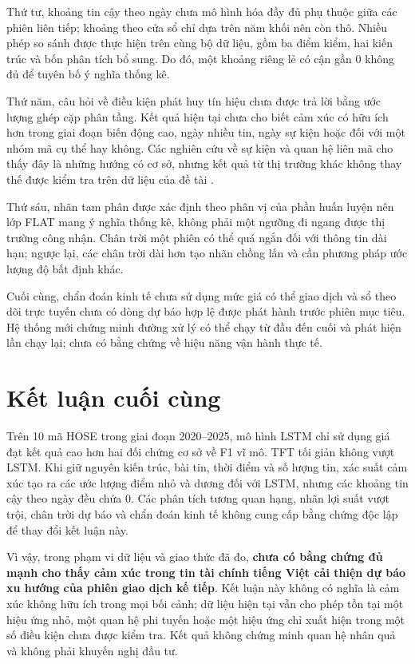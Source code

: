 \documentclass[12pt, a4paper, oneside]{report}
\begin{document}
Thứ tư, khoảng tin cậy theo ngày chưa mô hình hóa đầy đủ phụ thuộc giữa các phiên liên
tiếp; khoảng theo cửa sổ chỉ dựa trên năm khối nên còn thô. Nhiều phép so sánh được
thực hiện trên cùng bộ dữ liệu, gồm ba điểm kiểm, hai kiến trúc và bốn phân tích bổ sung.
Do đó, một khoảng riêng lẻ có cận gần 0 không đủ để tuyên bố ý nghĩa thống kê.


Thứ năm, câu hỏi về điều kiện phát huy tín hiệu chưa được trả lời bằng ước lượng ghép
cặp phân tầng. Kết quả hiện tại chưa cho biết cảm xúc có hữu ích hơn trong giai đoạn
biến động cao, ngày nhiều tin, ngày sự kiện hoặc đối với một nhóm mã cụ thể hay không.
Các nghiên cứu về sự kiện và quan hệ liên mã cho thấy đây là những hướng có cơ sở, nhưng
kết quả từ thị trường khác không thay thế được kiểm tra trên dữ liệu của đề tài
\cite{Chen2019_191005078v1,Xu2021_210207372v2}.

Thứ sáu, nhãn tam phân được xác định theo phân vị của phần huấn luyện nên lớp FLAT mang
ý nghĩa thống kê, không phải một ngưỡng đi ngang được thị trường công nhận. Chân trời
một phiên có thể quá ngắn đối với thông tin dài hạn; ngược lại, các chân trời dài hơn
tạo nhãn chồng lấn và cần phương pháp ước lượng độ bất định khác.

Cuối cùng, chẩn đoán kinh tế chưa sử dụng mức giá có thể giao dịch và sổ theo dõi trực
tuyến chưa có dòng dự báo hợp lệ được phát hành trước phiên mục tiêu. Hệ thống mới chứng
minh đường xử lý có thể chạy từ đầu đến cuối và phát hiện lần chạy lại; chưa có bằng
chứng về hiệu năng vận hành thực tế.

\section{Kết luận cuối cùng}

Trên 10 mã HOSE trong giai đoạn 2020--2025, mô hình LSTM chỉ sử dụng giá đạt kết quả
cao hơn hai đối chứng cơ sở về F1 vĩ mô. TFT tối giản không vượt LSTM. Khi giữ nguyên
kiến trúc, bài tin, thời điểm và số lượng tin, xác suất cảm xúc tạo ra các ước lượng
điểm nhỏ và dương đối với LSTM, nhưng các khoảng tin cậy theo ngày đều chứa 0. Các phân
tích tương quan hạng, nhãn lợi suất vượt trội, chân trời dự báo và chẩn đoán kinh tế
không cung cấp bằng chứng độc lập để thay đổi kết luận này.

Vì vậy, trong phạm vi dữ liệu và giao thức đã đo, \textbf{chưa có bằng chứng đủ mạnh
cho thấy cảm xúc trong tin tài chính tiếng Việt cải thiện dự báo xu hướng của phiên
giao dịch kế tiếp}. Kết luận này không có nghĩa là cảm xúc không hữu ích trong mọi bối
cảnh; dữ liệu hiện tại vẫn cho phép tồn tại một hiệu ứng nhỏ, một quan hệ phi tuyến
hoặc một hiệu ứng chỉ xuất hiện trong một số điều kiện chưa được kiểm tra. Kết quả không
chứng minh quan hệ nhân quả và không phải khuyến nghị đầu tư.
\end{document}
